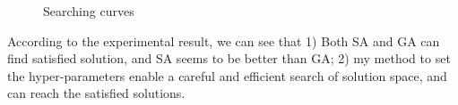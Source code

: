 \documentclass[a4paper,12pt]{article}
\begin{document}
\begin{figure}[!htbp]
	\caption{Searching curves}
	\end{figure}

	According to the experimental result, we can see that 1) Both SA and GA can find satisfied solution, and SA seems to be better than GA; 2) my method to set the hyper-parameters enable a careful and efficient search of solution space, and can reach the satisfied solutions.
\end{document}
